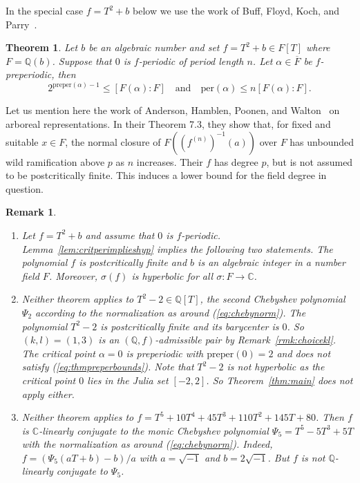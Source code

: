 \documentclass[12pt,oneside,a4]{amsart}
\newcommand{\IC}{\mathbb{C}}
\newcommand{\IQ}{\mathbb{Q}}
\newcounter{maincounter}
\numberwithin{maincounter}{section}
\numberwithin{equation}{section}
\newtheorem{theorem}[maincounter]{Theorem}
\newtheorem{remark}[maincounter]{Remark}
\begin{document}
In the special case $f=T^2+b$ below we use the work of Buff, Floyd,
Koch, and Parry~\cite{BFKP:Gleason}.

\begin{theorem}
  \label{thm:mainpreperdeg2}
  Let $b$ be an algebraic number and set $f=T^2+b\in F[T]$ where
  $F=\IQ(b)$.
  Suppose that $0$ is $f$-periodic of period length $n$. 
  Let $\alpha\in \overline F$ be $f$-preperiodic, then 
  \begin{equation}
    \label{eq:thmpreperbounds_deg2}
    2^{{\mathrm{preper}(\alpha)}-1} \le [F(\alpha):F] 
    \quad\text{and}\quad
    \mathrm{per}(\alpha)\le n [F(\alpha):F].
  \end{equation}  
\end{theorem}

Let us mention here the work of Anderson, Hamblen, Poonen, and
Walton~\cite{AHPW:18} on arboreal representations. In their Theorem
7.3, they show that, for fixed and suitable $x\in F$,  the normal closure of
$F((f^{(n)})^{-1}(a))$ over $F$ has
unbounded wild ramification above $p$ as $n$ increases.
Their $f$ has degree $p$, but is not assumed to be postcritically
finite. 
This induces a lower bound for the field degree in question.


\begin{remark}
  \begin{enumerate}
  \item[(i)] Let $f=T^2+b$ and assume that
    $0$ is $f$-periodic. Lemma~\ref{lem:critperimplieshyp}
    implies the following two statements. The polynomial $f$ is
    postcritically finite and $b$ is an algebraic integer in a number
    field $F$. Moreover,
    $\sigma(f)$ is hyperbolic for all $\sigma\colon F\rightarrow \IC$.
    
  \item [(ii)]   Neither theorem applies to $T^2-2 \in \IQ[T]$,
    the second Chebyshev polynomial $\Psi_2$ according to the
    normalization as around (\ref{eq:chebynorm}). The polynomial $T^2-2$ is
  postcritically finite and its barycenter is $0$. So
  $(k,l)=(1,3)$ is an $(\IQ,f)$-admissible pair by Remark~\ref{rmk:choicekl}.
  The critical point $\alpha=0$ is preperiodic with
  $\mathrm{preper}(0)=2$ and does not satisfy
  (\ref{eq:thmpreperbounds}). Note that $T^2-2$ is not hyperbolic as the
  critical point $0$ lies in the Julia set $[-2,2]$. So
  Theorem~\ref{thm:main} does not apply either.
  \item[(iii)] Neither theorem applies to
    $f=T^5+10T^4+45T^3+110T^2+145T+80$.
    Then $f$ is $\IC$-linearly conjugate to the
    monic Chebyshev polynomial
    $\Psi_5=T^5-5T^3+5T$ with the normalization as around
    (\ref{eq:chebynorm}). 
    Indeed, $f = (\Psi_5(aT+b)-b)/a$ with
    $a=\sqrt{-1}$ and $b=2\sqrt{-1}$.
    But $f$ is not $\IQ$-linearly conjugate to $\Psi_5$. 
  \end{enumerate}  
\end{remark}
\end{document}
